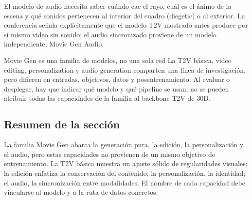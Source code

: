 
El modelo de audio necesita saber cuándo cae el rayo, cuál es el ánimo de la escena y qué sonidos pertenecen al interior del cuadro (diegetic) o al exterior. La conferencia señala explícitamente que el modelo T2V mostrado antes produce por sí mismo video sin sonido; el audio sincronizado proviene de un modelo independiente, Movie Gen Audio.

\begin{importantbox}{Movie Gen es una familia de modelos, no una sola red}
La T2V básica, video editing, personalization y audio generation comparten una línea de investigación, pero difieren en entradas, objetivos, datos y posentrenamiento. Al evaluar o desplegar, hay que indicar qué modelo y qué pipeline se usan; no se pueden atribuir todas las capacidades de la familia al backbone T2V de 30B.
\end{importantbox}


\subsection{Resumen de la sección}

La familia Movie Gen abarca la generación pura, la edición, la personalización y el audio, pero estas capacidades no provienen de un mismo objetivo de entrenamiento. La T2V básica muestra un ajuste sólido de regularidades visuales; la edición enfatiza la conservación del contenido; la personalización, la identidad; el audio, la sincronización entre modalidades. El nombre de cada capacidad debe vincularse al modelo y a la ruta de datos concretos.
